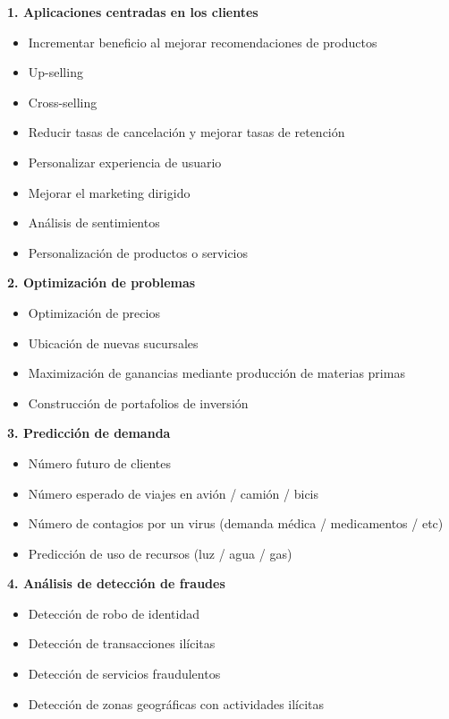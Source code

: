 \documentclass[
]{book}
\providecommand{\tightlist}{%
  \setlength{\itemsep}{0pt}\setlength{\parskip}{0pt}}
\begin{document}
\textbf{1. Aplicaciones centradas en los clientes}

\begin{itemize}
\tightlist
\item
  Incrementar beneficio al mejorar recomendaciones de productos
\item
  Up-selling
\item
  Cross-selling
\item
  Reducir tasas de cancelación y mejorar tasas de retención
\item
  Personalizar experiencia de usuario
\item
  Mejorar el marketing dirigido
\item
  Análisis de sentimientos
\item
  Personalización de productos o servicios
\end{itemize}

\textbf{2. Optimización de problemas}

\begin{itemize}
\tightlist
\item
  Optimización de precios
\item
  Ubicación de nuevas sucursales
\item
  Maximización de ganancias mediante producción de materias primas
\item
  Construcción de portafolios de inversión
\end{itemize}

\textbf{3. Predicción de demanda}

\begin{itemize}
\tightlist
\item
  Número futuro de clientes
\item
  Número esperado de viajes en avión / camión / bicis
\item
  Número de contagios por un virus (demanda médica / medicamentos / etc)
\item
  Predicción de uso de recursos (luz / agua / gas)
\end{itemize}

\textbf{4. Análisis de detección de fraudes}

\begin{itemize}
\tightlist
\item
  Detección de robo de identidad
\item
  Detección de transacciones ilícitas
\item
  Detección de servicios fraudulentos
\item
  Detección de zonas geográficas con actividades ilícitas
\end{itemize}

  
\end{document}
